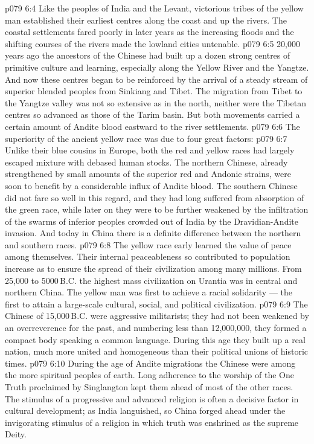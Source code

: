 \vs p079 6:4 Like the peoples of India and the Levant, victorious tribes of the yellow man established their earliest centres along the coast and up the rivers. The coastal settlements fared poorly in later years as the increasing floods and the shifting courses of the rivers made the lowland cities untenable.
\vs p079 6:5 20,000 years ago the ancestors of the Chinese had built up a dozen strong centres of primitive culture and learning, especially along the Yellow River and the Yangtze. And now these centres began to be reinforced by the arrival of a steady stream of superior blended peoples from Sinkiang and Tibet. The migration from Tibet to the Yangtze valley was not so extensive as in the north, neither were the Tibetan centres so advanced as those of the Tarim basin. But both movements carried a certain amount of Andite blood eastward to the river settlements.
\vs p079 6:6 The superiority of the ancient yellow race was due to four great factors:
\vs p079 6:7 \bibnobreakspace {} Unlike their blue cousins in Europe, both the red and yellow races had largely escaped mixture with debased human stocks. The northern Chinese, already strengthened by small amounts of the superior red and Andonic strains, were soon to benefit by a considerable influx of Andite blood. The southern Chinese did not fare so well in this regard, and they had long suffered from absorption of the green race, while later on they were to be further weakened by the infiltration of the swarms of inferior peoples crowded out of India by the Dravidian\hyp{}Andite invasion. And today in China there is a definite difference between the northern and southern races.
\vs p079 6:8 \bibnobreakspace {} The yellow race early learned the value of peace among themselves. Their internal peaceableness so contributed to population increase as to ensure the spread of their civilization among many millions. From 25,000 to 5000\,B.C. the highest mass civilization on Urantia was in central and northern China. The yellow man was first to achieve a racial solidarity --- the first to attain a large\hyp{}scale cultural, social, and political civilization.
\vs p079 6:9 The Chinese of 15,000\,B.C. were aggressive militarists; they had not been weakened by an overreverence for the past, and numbering less than 12,000,000, they formed a compact body speaking a common language. During this age they built up a real nation, much more united and homogeneous than their political unions of historic times.
\vs p079 6:10 \bibnobreakspace {} During the age of Andite migrations the Chinese were among the more spiritual peoples of earth. Long adherence to the worship of the One Truth proclaimed by Singlangton kept them ahead of most of the other races. The stimulus of a progressive and advanced religion is often a decisive factor in cultural development; as India languished, so China forged ahead under the invigorating stimulus of a religion in which truth was enshrined as the supreme Deity.

